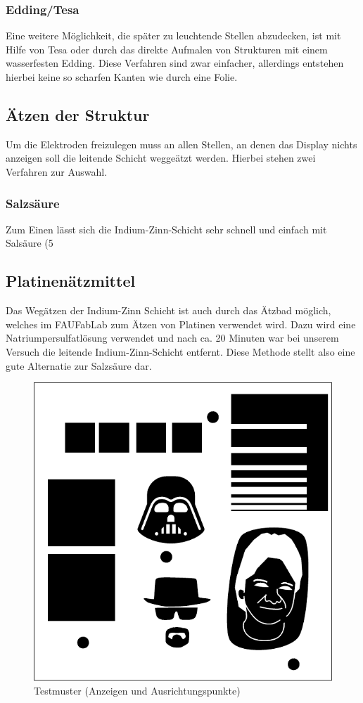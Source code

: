 \subsubsection*{Edding/Tesa}
Eine weitere Möglichkeit, die später zu leuchtende Stellen abzudecken, ist mit Hilfe von Tesa oder durch das direkte Aufmalen von Strukturen mit einem wasserfesten Edding. Diese Verfahren sind zwar einfacher, allerdings entstehen hierbei keine so scharfen Kanten wie durch eine Folie.

\subsection{Ätzen der Struktur}

Um die Elektroden freizulegen muss an allen Stellen, an denen das Display nichts anzeigen soll die leitende Schicht weggeätzt werden. Hierbei stehen zwei Verfahren zur Auswahl.

\subsubsection*{Salzsäure}

Zum Einen lässt sich die Indium-Zinn-Schicht sehr schnell und einfach mit Salsäure (5%

\subsection*{Platinenätzmittel}
Das Wegätzen der Indium-Zinn Schicht ist auch durch das Ätzbad möglich, welches im FAUFabLab zum Ätzen von Platinen verwendet wird. Dazu wird eine Natriumpersulfatlösung verwendet und nach ca. 20 Minuten war bei unserem Versuch die leitende Indium-Zinn-Schicht entfernt. Diese Methode stellt also eine gute Alternatie zur Salzsäure dar.

\begin{figure}[t]
  \centering
  \includegraphics[width=0.5\linewidth, keepaspectratio]{Bilder/testmuster}
  \caption{Testmuster (Anzeigen und Ausrichtungspunkte)}
  \label{testmuster}
\end{figure}


